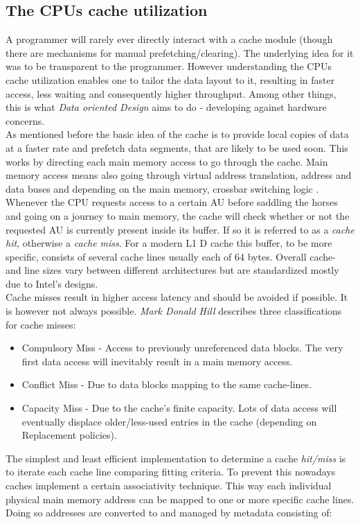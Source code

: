 \subsection{The CPUs cache utilization}\label{cpucu}
A programmer will rarely ever directly interact with a cache module (though there are mechanisms for manual prefetching/clearing). The underlying idea for it was to be transparent to the programmer. However understanding the CPUs cache utilization enables one to tailor the data layout to it, resulting in faster access, less waiting and consequently higher throughput. Among other things, this is what \textit{Data oriented Design} aims to do - developing against hardware concerns.\\
As mentioned before the basic idea of the cache is to provide local copies of data at a faster rate and prefetch data segments, that are likely to be used soon. This works by directing each main memory access to go through the cache. Main memory access means also going through virtual address translation, address and data buses and depending on the main memory, crossbar switching logic .  
Whenever the CPU requests access to a certain AU before saddling the horses and going on a journey to main memory, the cache will check whether or not the requested AU is currently present inside its buffer. If so it is referred to as a \textit{cache hit}, otherwise a \textit{cache miss}. For a modern L1 D cache this buffer, to be more specific, consists of several cache lines usually each of 64 bytes. Overall cache- and line sizes vary between different architectures but are standardized mostly due to Intel's designs.\\
Cache misses result in higher access latency and should be avoided if possible. It is however not always possible. \textit{Mark Donald Hill} describes three classifications for cache misses:
\begin{itemize}
	\item Compulsory Miss - Access to previously unreferenced data blocks. The very first data access will inevitably result in a main memory access.
	\item Conflict Miss - Due to data blocks mapping to the same cache-lines.
	\item Capacity Miss - Due to the cache's finite capacity. Lots of data access will eventually displace older/less-used entries in the cache (depending on Replacement policies).
\end{itemize}
The simplest and least efficient implementation to determine a cache \textit{hit/miss} is to iterate each cache line comparing fitting criteria. To prevent this nowadays caches implement a certain associativity technique. This way each individual physical main memory address can be mapped to one or more specific cache lines. Doing so addresses are converted to and managed by metadata consisting of: 
